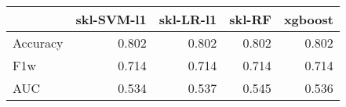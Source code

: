\begin{tabular}{lrrrr}
\toprule
{} &  skl-SVM-l1 &  skl-LR-l1 &  skl-RF &  xgboost \\
\midrule
Accuracy &       0.802 &      0.802 &   0.802 &    0.802 \\
F1w      &       0.714 &      0.714 &   0.714 &    0.714 \\
AUC      &       0.534 &      0.537 &   0.545 &    0.536 \\
\bottomrule
\end{tabular}
